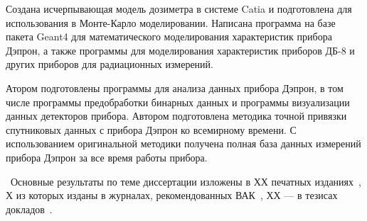 Создана исчерпывающая модель дозиметра в системе Catia и подготовлена для использования в Монте-Карло моделировании. Написана программа на базе пакета Geant4 для математического моделирования характеристик прибора Дэпрон, а также программы для моделирования характеристик приборов ДБ-8 и других приборов для радиационных измерений. 

Атором подготовлены программы для анализа данных прибора Дэпрон, в том числе программы предобработки бинарных данных и программы визуализации данных детекторов прибора. 
Автором подготовлена методика точной привязки спутниковых данных с прибора Дэпрон ко всемирному времени. С использованием оригинальной методики получена полная база данных измерений прибора Дэпрон за все время работы прибора.

\publications\ Основные результаты по теме диссертации изложены в ХХ печатных изданиях~\cite{zolotarev2017numerical51590279,vlasova2017optimization27547274,vlasova2015operational11246447},
Х из которых изданы в журналах, рекомендованных ВАК~\cite{zolotarev2016chislennoe32150868}, 
ХХ --- в тезисах докладов~\cite{zolotarev2016modelirovanie36997161,grafodatsky2016development21020642, amelyushkin2015sozdanie10657329, angelopoulos2010university5851829, angelopoulos2011university1295357}.
